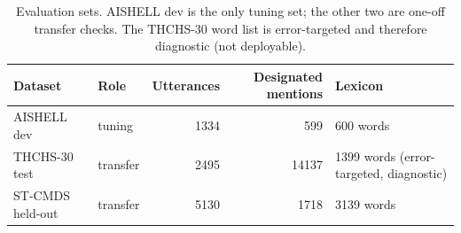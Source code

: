%
%
%
%

\newcommand{\TBD}{\textsuperscript{\textdagger}}
\newcommand{\pp}{\,pp}

\begin{table}[t]
\centering
\caption{Evaluation sets. AISHELL dev is the only tuning set; the other two are
one-off transfer checks. The THCHS-30 word list is error-targeted and therefore
diagnostic (not deployable).}
\label{tab:datasets}
\begin{tabular}{llrrl}
\toprule
Dataset & Role & Utterances & Designated mentions & Lexicon \\
\midrule
AISHELL dev      & tuning    & 1334 &   599 & 600 words \\
THCHS-30 test    & transfer  & 2495 & 14137 & 1399 words (error-targeted, diagnostic) \\
ST-CMDS held-out & transfer  & 5130 &  1718 & 3139 words \\
\bottomrule
\end{tabular}
\end{table}

